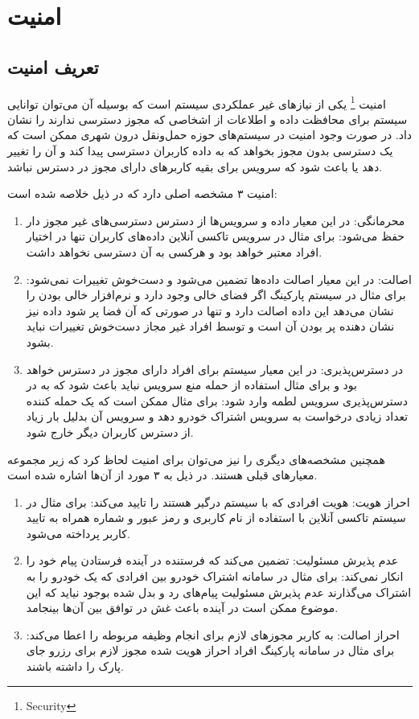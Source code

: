 \chapter{امنیت}
\section{تعریف امنیت}
امنیت \footnote{Security}
یکی از نیازهای غیر عملکردی سیستم است که بوسیله آن می‌توان توانایی سیستم برای محافظت داده و اطلاعات از اشخاصی که مجوز دسترسی ندارند را نشان داد.
در صورت وجود امنیت در سیستم‌‌های حوزه حمل‌ونقل درون شهری ممکن است که یک دسترسی بدون مجوز بخواهد که به داده کاربران دسترسی پیدا کند و آن را تغییر دهد یا باعث شود که سرویس برای بقیه کاربرهای دارای مجوز در دسترس نباشد.

امنیت ۳ مشخصه اصلی دارد که در ذیل خلاصه شده است:
\begin{enumerate}
\item
محرمانگی: در این معیار داده و سرویس‌ها از دسترس دسترسی‌های غیر مجوز دار حفظ می‌شود: برای مثال در سرویس تاکسی آنلاین داده‌های کاربران تنها در اختیار افراد معتبر خواهد بود و هرکسی به آن دسترسی نخواهد داشت.
\item
اصالت: در این معیار اصالت داده‌ها تضمین می‌شود و دست‌خوش تغییرات نمی‌شود: برای مثال در سیستم پارکینگ اگر فضای خالی وجود دارد و نرم‌افزار خالی بودن را نشان می‌دهد این داده اصالت دارد و تنها در صورتی که آن فضا پر شود داده نیز نشان دهنده پر بودن آن است و توسط افراد غیر مجاز دست‌خوش تغییرات نباید بشود.
\item 
در دسترس‌پذیری: در این معیار سیستم برای افراد دارای مجوز در دسترس خواهد بود و برای مثال استفاده از حمله منع سرویس نباید باعث شود که به در دسترس‌پذیری سرویس لطمه وارد شود: برای مثال ممکن است که یک حمله کننده تعداد زیادی درخواست به سرویس اشتراک خودرو دهد و سرویس آن بدلیل بار زیاد از دسترس کاربران دیگر خارج شود.
\end{enumerate}

همچنین مشخصه‌های دیگری را نیز می‌توان برای امنیت لحاظ کرد که زیر مجموعه‌ معیارهای قبلی هستند. 
در ذیل به ۳ مورد از آن‌ها اشاره شده است.
\begin{enumerate}
\item
احراز هویت: هویت افرادی که با سیستم درگیر هستند را تایید می‌کند: برای مثال در سیستم تاکسی آنلاین با استفاده از نام کاربری و رمز عبور و شماره همراه به تایید کاربر پرداخته می‌شود.
\item
عدم پذیرش مسئولیت: 
تضمین می‌کند که فرستنده در آینده فرستادن پیام خود را انکار نمی‌کند: برای مثال در سامانه اشتراک خودرو بین افرادی که یک خودرو را به اشتراک می‌گذارند عدم پذیرش مسئولیت پیام‌های رد و بدل شده بوجود نیاید که این موضوع ممکن است در آینده باعث غش در توافق بین‌ آن‌ها بینجامد.
\item
احراز اصالت: به کاربر مجوزهای لازم برای انجام وظیفه مربوطه را اعطا می‌کند: برای مثال در سامانه پارکینگ افراد احراز هویت شده مجوز لازم برای رزرو جای پارک را داشته باشند.
\end{enumerate}

